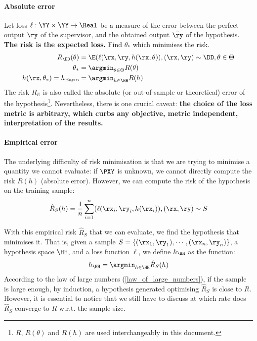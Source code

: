 \paragraph{Absolute error} Let loss \(\ell:\YY \times \YY \to \Real \) be a measure of the error between the perfect output \(\ry\) of the supervisor, and the obtained output \(\hat{\ry}\) of the hypothesis. \textbf{The risk is the expected loss.} Find \(\theta_*\) which minimises the risk.
\begin{align}
	R_{\DD}(\theta) &= \E(\ell(\rx, \ry, h(\rx, \theta)), (\rx, \ry)\sim \DD, \theta \in \Theta\\
	\theta_{*}&= \argmin_{\theta \in \Theta} R(\theta)\\
	h(\rx,\theta_*) = h_{\text{Bayes}} &= \argmin_{h \in \HH} R(h)
\end{align}
The risk \(R_{\DD}\) is also called the absolute (or out-of-sample or theoretical) error of the hypothesis\footnote{\(R\), \(R(\theta)\) and \(R(h)\) are used interchangeably in this document.}. Nevertheless, there is one crucial caveat: \textbf{the choice of the loss metric is arbitrary, which curbs any objective, metric independent, interpretation of the results.}
\paragraph{Empirical error} The underlying difficulty of risk minimisation is that we are trying to minimise a quantity we cannot evaluate: if \(\PXY\) is unknown, we cannot directly compute the risk \(R(h)\) (absolute error). However, we can compute the risk of the hypothesis on the training sample:
\begin{align}
	\hat{R}_{S}(h) = \frac{1}{n} \sum_{i=1}^{n}(\ell(\rx_i, \ry_i, h(\rx_i)), (\rx,\ry)\sim S
\end{align}

With this empirical risk \(\hat{R}_{S}\) that we can evaluate, we find the hypothesis that minimises it. That is, given a sample \(S = \{(\rx_1,\ry_1),\cdots,(\rx_n, \ry_n)\}\), a hypothesis space \(\HH\), and a loss function \(\ell\), we define \(h_{\HH}\) as the function:
\begin{align}
	h_{\HH} = \argmin_{h\in \HH} \hat{R}_{S}(h)
\end{align}
According to the law of large numbers (\cref{law_of_large_numbers}), if the sample is large enough, by induction, a hypothesis generated optimising \(\hat{R}_{S}\) is close to \(R\). However, it is essential to notice that we still have to discuss at which rate does \(\hat{R}_{S}\) converge to \(R\) w.r.t. the sample size.

